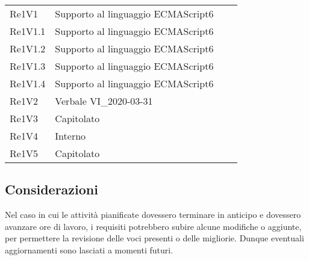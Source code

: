 \begin{longtable}{C{3cm} C{3cm} L{5.5cm} C{3cm}}
Re1V1 & Supporto al linguaggio ECMAScript6\\
Re1V1.1 & Supporto al linguaggio ECMAScript6\\
Re1V1.2 & Supporto al linguaggio ECMAScript6\\
Re1V1.3 & Supporto al linguaggio ECMAScript6\\
Re1V1.4 & Supporto al linguaggio ECMAScript6\\
Re1V2 & Verbale VI\_2020-03-31\\
Re1V3 & Capitolato\\
Re1V4 & Interno\\
Re1V5 & Capitolato\\
\end{longtable}
	

	\subsection{Considerazioni}
Nel caso in cui le attività pianificate dovessero terminare in anticipo e dovessero avanzare ore di lavoro, i requisiti potrebbero subire alcune modifiche o aggiunte, per permettere la revisione delle voci presenti o delle migliorie. Dunque eventuali aggiornamenti sono lasciati a momenti
futuri.


